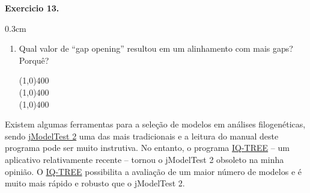\begin{refsection}
\begin{blackBlock}{\textbf{Exercicio 13.}}
\end{blackBlock}

\begin {myindentpar}{0.3cm}
\begin{enumerate}[\itshape i.]
	\item{Qual valor de ``gap opening'' resultou em um alinhamento com mais gaps? Porquê?}

\begin{center}
\line(1,0){400}\\
\line(1,0){400}\\
\line(1,0){400}\\
\end{center}

\end{enumerate}
\end{myindentpar}

Existem algumas ferramentas para a seleção de modelos em análises filogenéticas, sendo \href{http://code.google.com/p/jmodeltest2/}{jModelTest 2} \parencite[][]{Darriba_et_al_2012,Guidon_and_Gascuel_2003} uma das mais tradicionais e a leitura do manual deste programa pode ser muito instrutiva. No entanto, o programa \href{http://www.iqtree.org/}{IQ-TREE} \parencite{Nguyen_et_al_2015} -- um aplicativo relativamente recente -- tornou o jModelTest 2 obsoleto na minha opinião. O \href{http://www.iqtree.org/}{IQ-TREE} possibilita a avaliação de um maior número de modelos e é muito mais rápido e robusto que o jModelTest 2.


\end{refsection}
